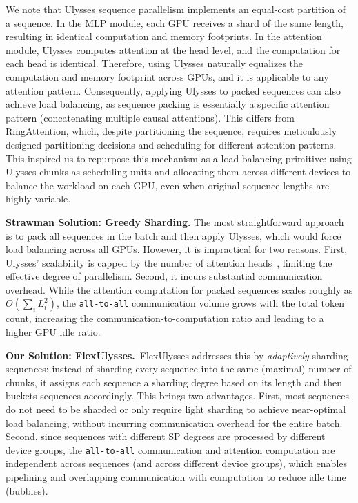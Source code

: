 We note that Ulysses sequence parallelism implements an equal-cost partition of a sequence. In the MLP module, each GPU receives a shard of the same length, resulting in identical computation and memory footprints. In the attention module, Ulysses computes attention at the head level, and the computation for each head is identical. Therefore, using Ulysses naturally equalizes the computation and memory footprint across GPUs, and it is applicable to any attention pattern. Consequently, applying Ulysses to packed sequences can also achieve load balancing, as sequence packing is essentially a specific attention pattern (concatenating multiple causal attentions). This differs from RingAttention, which, despite partitioning the sequence, requires meticulously designed partitioning decisions and scheduling for different attention patterns. This inspired us to repurpose this mechanism as a load-balancing primitive: using Ulysses chunks as scheduling units and allocating them across different devices to balance the workload on each GPU, even when original sequence lengths are highly variable.

\noindent\textbf{Strawman Solution: Greedy Sharding.} The most straightforward approach is to pack all sequences in the batch and then apply Ulysses, which would force load balancing across all GPUs. However, it is impractical for two reasons. First, Ulysses' scalability is capped by the number of attention heads~\cite{ulysses}, limiting the effective degree of parallelism. Second, it incurs substantial communication overhead. While the attention computation for packed sequences scales roughly as $O(\sum_i L_i^2)$, the \texttt{all-to-all} communication volume grows with the total token count, increasing the communication-to-computation ratio and leading to a higher GPU idle ratio.

\noindent\textbf{Our Solution: FlexUlysses.}~FlexUlysses addresses this by \emph{adaptively} sharding sequences: instead of sharding every sequence into the same (maximal) number of chunks, it assigns each sequence a sharding degree based on its length and then buckets sequences accordingly. This brings two advantages. First, most sequences do not need to be sharded or only require light sharding to achieve near-optimal load balancing, without incurring communication overhead for the entire batch. Second, since sequences with different SP degrees are processed by different device groups, the \texttt{all-to-all} communication and attention computation are independent across sequences (and across different device groups), which enables pipelining and overlapping communication with computation to reduce idle time (bubbles).

